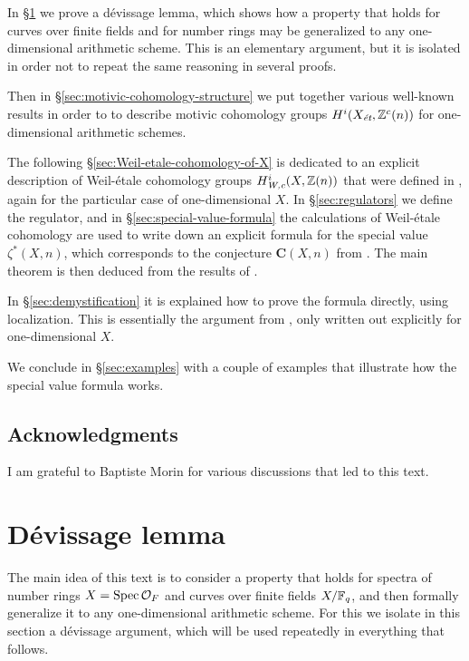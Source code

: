 \documentclass{article}
\numberwithin{equation}{section}
\begin{document}
In \S\ref{sec:devissage} we prove a dévissage lemma, which shows how a property
that holds for curves over finite fields and for number rings may be generalized
to any one-dimensional arithmetic scheme. This is an elementary argument, but it
is isolated in order not to repeat the same reasoning in several proofs.

Then in \S\ref{sec:motivic-cohomology-structure} we put together various
well-known results in order to to describe motivic cohomology groups
$H^i (X_\et, \ZZ^c(n))$ for one-dimensional arithmetic schemes.

The following \S\ref{sec:Weil-etale-cohomology-of-X} is dedicated to an explicit
description of Weil-étale cohomology groups $H^i_\Wc (X, \ZZ(n))$ that were
defined in \cite{Beshenov-Weil-etale-1}, again for the particular case of
one-dimensional $X$. In \S\ref{sec:regulators} we define the regulator, and in
\S\ref{sec:special-value-formula} the calculations of Weil-étale cohomology are
used to write down an explicit formula for the special value $\zeta^* (X,n)$,
which corresponds to the conjecture $\mathbf{C} (X,n)$ from
\cite{Beshenov-Weil-etale-2}. The main theorem is then deduced from the results
of \cite{Beshenov-Weil-etale-2}.

In \S\ref{sec:demystification} it is explained how to prove the formula
directly, using localization. This is essentially the argument from
\cite{Beshenov-Weil-etale-2}, only written out explicitly for one-dimensional
$X$.

We conclude in \S\ref{sec:examples} with a couple of examples that illustrate
how the special value formula works.

\subsection*{Acknowledgments}

I am grateful to Baptiste Morin for various discussions that led to this text.


\section{Dévissage lemma}
\label{sec:devissage}

The main idea of this text is to consider a property that holds for spectra of
number rings $X = \Spec \mathcal{O}_F$ and curves over finite fields $X/\FF_q$,
and then formally generalize it to any one-dimensional arithmetic scheme.
For this we isolate in this section a dévissage argument, which will be used
repeatedly in everything that follows.
\end{document}
